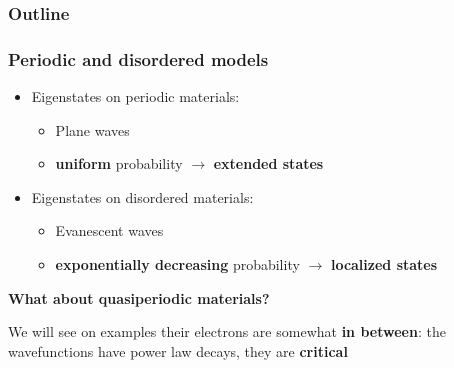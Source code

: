 \documentclass[xcolor=x11names,compress,professionalfonts, aspectratio=169]{beamer}
\renewcommand{\(}{\begin{columns}}
\renewcommand{\)}{\end{columns}}
\newcommand{\<}[1]{\begin{column}{#1}}
\renewcommand{\>}{\end{column}}
\begin{document}

\begin{frame}
\frametitle{Outline}
\tableofcontents[hideallsubsections]
\end{frame}

\begin{frame}
\frametitle{Periodic and disordered models}
\begin{itemize}
	\item Eigenstates on periodic materials: 
	\begin{itemize}
		\item Plane waves 
		\item \textbf{uniform} probability $\rightarrow$ \textbf{extended states}
	\end{itemize}
	
	\item Eigenstates on disordered materials: 
	\begin{itemize}
		\item Evanescent waves
		\item  \textbf{exponentially decreasing} probability $\rightarrow$ \textbf{localized states}
	\end{itemize}
	
\end{itemize}
\textbf{What about quasiperiodic materials?}

\textcolor{Complementary}{We will see on examples their electrons are somewhat \textbf{in between}: the wavefunctions have power law decays, they are \textbf{critical}}
\end{frame}
\end{document}
